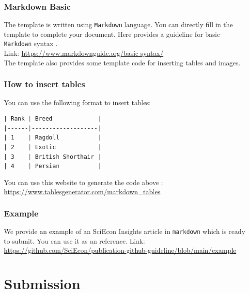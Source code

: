 \documentclass{beamer}
\begin{document}
\begin{frame}
\frametitle{Markdown Basic}

The template is written using \texttt{Markdown} language. You can directly fill in the template to complete your document.
\vspace{.5em}
Here provides a guideline for basic \texttt{Markdown} syntax \cite{noauthor_basic_nodate}.\\
\vspace{.5em}
Link: \url{https://www.markdownguide.org/basic-syntax/}\\
\vspace{.5em}
The template also provides some template code for inserting tables and images.

\end{frame}

\begin{frame}[fragile]
    \frametitle{How to insert tables}

    You can use the following format to insert tables:

    \begin{lstlisting}
| Rank | Breed             |
|------|-------------------|
| 1    | Ragdoll           |
| 2    | Exotic            |
| 3    | British Shorthair |
| 4    | Persian           |
    \end{lstlisting}
    You can use this website to generate the code above \cite{noauthor_markdown_nodate}:\\
    \url{https://www.tablesgenerator.com/markdown_tables}

\end{frame}

\begin{frame}
    \frametitle{Example}

    We provide an example of an SciEcon Insights article in \texttt{markdown} which is ready to submit. You can use it as an reference.
    \vspace{1em}
    Link: \url{https://github.com/SciEcon/publication-github-guideline/blob/main/example}

\end{frame}

\section{Submission}
\end{document}
